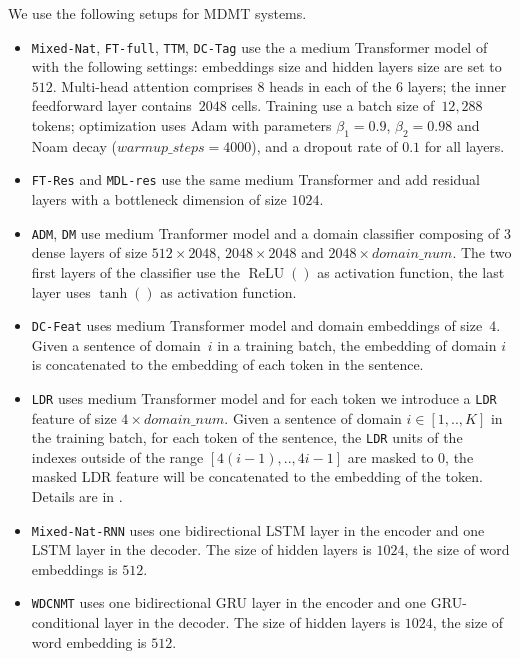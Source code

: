 \documentclass[11pt,a4paper]{article}
\newcommand{\fyTodo}[1]{\Todo[FY:]{\textcolor{orange}{#1}}}
\newcommand{\revision}[1]{#1}
\newcommand{\system}[1]{\texttt{{#1}}}
\begin{document}
\revision{%
We use the following setups for MDMT systems.
\begin{itemize}
\item \system{Mixed-Nat}, \system{FT-full}, \system{TTM}, \system{DC-Tag} use the a medium Transformer model of \cite{Vaswani17attention} with the following settings: embeddings size and hidden layers size are set to~$512$. Multi-head attention comprises 8 heads in each of the 6 layers; the inner feedforward layer contains~$2048$ cells. 
Training use a batch size of~$12,288$ tokens; optimization uses Adam with parameters $\beta_1=0.9$, $\beta_2= 0.98$ and Noam decay ($warmup\_steps=4000$), and a dropout rate of $0.1$ for all layers.
\item \system{FT-Res} and \system{MDL-res} use the same medium Transformer and add residual layers with a bottleneck dimension of size $1024$.
\item \system{ADM}, \system{DM} use medium Tranformer model and a domain classifier composing of 3 dense layers of size $512 \times 2048$, $2048 \times 2048$ and $2048 \times domain\_num$. The two first layers of the classifier use the $\operatorname{ReLU}()$ as activation function, the last layer uses $\tanh()$ as activation function.
\item \system{DC-Feat} uses medium Transformer model and domain embeddings of size~$4$. Given a sentence of domain~$i$ in a training batch, the embedding of domain $i$ is concatenated to the embedding of each token in the sentence.
\item \system{LDR} uses medium Transformer model and for each token we introduce a \system{LDR} feature of size $4 \times domain\_num$. Given a sentence of domain $i\in[1,..,K]$ in the training batch, for each token of the sentence, the \system{LDR} units of the indexes outside of the range $[4(i-1),..,4i-1]$ are masked to $0$, the masked LDR feature will be concatenated to the embedding of the token. Details are in \cite{Pham19generic}.
\item \system{Mixed-Nat-RNN} uses one bidirectional LSTM layer in the encoder and one LSTM layer in the decoder. The size of hidden layers is $1024$, the size of word embeddings is $512$. 
\item \system{WDCNMT} uses one bidirectional GRU layer in the encoder and one GRU-conditional layer in the decoder. The size of hidden layers is $1024$, the size of word embedding is $512$.
\end{itemize}
}
\end{document}
